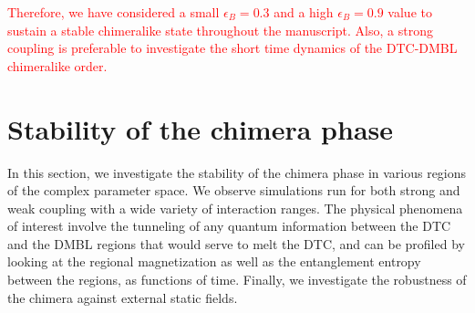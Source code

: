 \documentclass[12pt]{iopart}
\newcommand{\red}[1]{\textcolor{red}{#1}}
\begin{document}
\red{ Therefore, we have considered a small $\epsilon_B = 0.3$ and a high $\epsilon_B = 0.9$ value to sustain a stable chimeralike state throughout the manuscript. Also, a strong coupling is preferable to investigate the short time dynamics of the DTC-DMBL chimeralike order.}

\section{\label{sec:level4} Stability of the chimera phase}
In this section, we investigate the stability of the chimera phase in various regions of the complex parameter space. We observe simulations run for both strong and weak coupling with a wide variety of interaction ranges. The physical phenomena of interest involve the tunneling of any quantum information between the DTC and the DMBL regions that would serve to melt the DTC, and can be profiled by looking at the regional magnetization as well as the entanglement entropy between the regions, as functions of time. Finally, we investigate the robustness of the chimera against external static fields.
\end{document}
